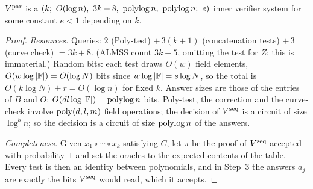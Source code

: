 \begin{theorem}\label{thm:par}
$V^{\rm par}$ is a $(k;\ O(\log n),\ 3k+8,\ \polylog n,\ \polylog n;\ e)$ inner verifier system for some constant $e<1$ depending on $k$.
\end{theorem}
\begin{proof}
\emph{Resources.}  Queries: $2$ (Poly-test) $+\,3(k+1)$ (concatenation tests) $+\,3$ (curve check) $=3k+8$.  (ALMSS count $3k+5$, omitting the test for $Z$; this is immaterial.)
Random bits: each test draws $O(w)$ field elements, \ie $O(w\log|\mathbb{F}|)=O(\log N)$ bits since $w\log|\mathbb{F}|=s\log N$, so the total is $O(k\log N)+r=O(\log n)$ for fixed $k$.  Answer sizes are those of the entries of $B$ and $O$: $O(dl\log|\mathbb{F}|)=\operatorname{polylog} n$ bits.
Poly-test, the correction and the curve-check involve $\operatorname{poly}(d,l,m)$ field operations; the decision of $V^{\rm seq}$ is a circuit of size $\log^bn$; so the decision is a circuit of size $\operatorname{polylog} n$ of the answers.

\emph{Completeness.}  Given $x_1\circ\cdots\circ x_k$ satisfying $C$, let $\pi$ be the proof of $V^{\rm seq}$ accepted with probability~$1$ and set the oracles to the expected contents of the table.  Every test is then an identity between polynomials, and in Step~3 the answers $a_j$ are exactly the bits $V^{\rm seq}$ would read, which it accepts.


\end{proof}
